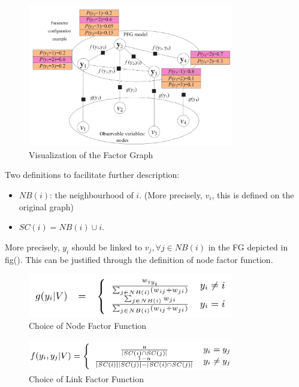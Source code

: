 \begin{figure}[htb]
\centering
	\includegraphics[width=0.8\textwidth]{fig/wang2011-FG-vis.png}
	\caption{Visualization of the Factor Graph}
\end{figure}

Two definitions to facilitate further description:
\begin{itemize}
	\item $NB(i)$: the neighbourhood of $i$. (More precisely, 
	$v_i$, this is defined on the original graph)
	\item $SC(i) = NB(i) \cup i$. 
\end{itemize} 

More precisely, $y_i$ should be linked to $v_j, \forall j \in NB(i)$
in the FG depicted in fig(). This can be justified through the definition
of node factor function. 

\begin{figure}[htb]
\centering
	\includegraphics[width=0.8\textwidth]{fig/wang2011-nodefactor.png}
	\caption{Choice of Node Factor Function}
\end{figure}

\begin{figure}[htb]
\centering
	\includegraphics[width=0.8\textwidth]{fig/wang2011-edgefactor.png}
	\caption{Choice of Link Factor Function}
\end{figure}

